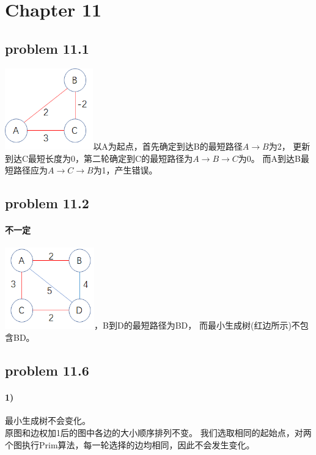 \documentclass[11pt,a4paper,oneside,oldfontcommands]{ctexart}
\begin{document}
\section*{Chapter 11}
{\subsection*{problem 11.1}}
\includegraphics[height=100pt]{11-1.png}以A为起点，首先确定到达B的最短路径$A\rightarrow B$为2，
更新到达C最短长度为0，第二轮确定到C的最短路径为$A\rightarrow B\rightarrow C$为0。
而A到达B最短路径应为$A\rightarrow C\rightarrow B$为1，产生错误。
{\subsection*{problem 11.2}}
\paragraph*{不一定}\includegraphics[height=100pt]{11-2.png}，B到D的最短路径为BD，
而最小生成树(红边所示)不包含BD。
{\subsection*{problem 11.6}}
\paragraph*{1)}
最小生成树不会变化。\\原图和边权加1后的图中各边的大小顺序排列不变。
我们选取相同的起始点，对两个图执行Prim算法，每一轮选择的边均相同，因此不会发生变化。
\end{document}
